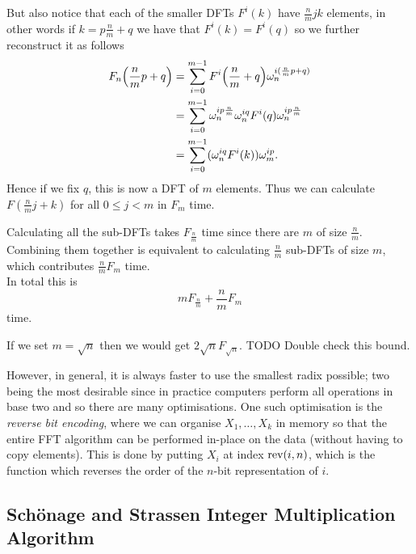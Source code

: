 But also notice that each of the smaller DFTs $F^i(k)$ have $\frac{n}{m}jk$ elements, in other words if $k = p\frac{n}{m} + q$ we have that $F^i(k) = F^i(q)$ so we further reconstruct it as follows
\begin{align*}
    F_n\bb{\frac{n}{m}p + q} &= \sum^{m-1}_{i=0} F^i\bb{\frac{n}{m} + q}\omega^{i(\frac{n}{m}p + q)}_n\\
    &= \sum^{m-1}_{i=0} \omega^{ip\frac{n}{m}}_n \omega_n^{iq} F^i(q)\omega^{ip\frac{n}{m}}_n\\
    &= \sum^{m-1}_{i=0} (\omega^{iq}_n F^i(k))\omega^{ip}_m.
\end{align*}
Hence if we fix $q$, this is now a DFT of $m$ elements. Thus we can calculate $F(\frac{n}{m}j + k)$ for all $0 \leq j < m$ in $F_m$ time.

Calculating all the sub-DFTs takes $F_{\frac{n}{m}}$ time since there are $m$ of size $\frac{n}{m}$. Combining them together is equivalent to calculating $\frac{n}{m}$ sub-DFTs of size $m$, which contributes $\frac{n}{m}F_{m}$ time.\\
In total this is
\[
    mF_{\frac{n}{m}} + \frac{n}{m}F_m
\]
time.

If we set $m = \sqrt{n}$ then we would get $2\sqrt{n}F_{\sqrt{n}}$. TODO Double check this bound.

However, in general, it is always faster to use the smallest radix possible; two being the most desirable since in practice computers perform all operations in base two and so there are many optimisations. One such optimisation is the \emph{reverse bit encoding}, where we can organise $X_1, \ldots, X_k$ in memory so that the entire FFT algorithm can be performed in-place on the data (without having to copy elements). This is done by putting $X_i$ at index $\textrm{rev}(i, n)$, which is the function which reverses the order of the $n$-bit representation of $i$.

\subsection{Sch\"{o}nage and Strassen Integer Multiplication Algorithm}
\label{subsec:schon-strass}

